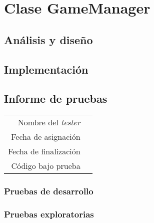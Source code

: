 \section{Clase GameManager}

\subsection{Análisis y diseño}

\subsection{Implementación}

\subsection{Informe de pruebas}

{\small
\begin{tabular}{r|l}
Nombre del \textit{tester} & \\
Fecha de asignación & \\
Fecha de finalización & \\
Código bajo prueba &
\end{tabular}
}

\subsubsection{Pruebas de desarrollo}

\subsubsection{Pruebas exploratorias}

